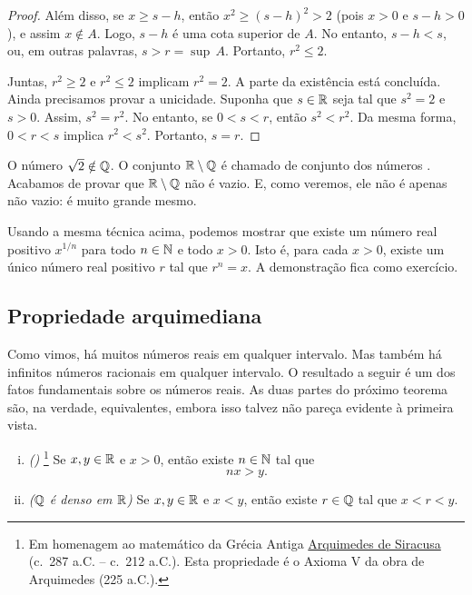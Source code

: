 \begin{example}
\begin{proof}
Além disso, se $x \geq s-h$,
então $x^2 \geq {(s-h)}^2 > 2$ (pois $x > 0$ e $s-h > 0$), e assim $x \notin A$.
Logo,
$s-h$ é uma cota superior de $A$. No entanto, $s-h < s$, ou, em outras
palavras, $s > r = \sup\, A$. Portanto, $r^2 \leq 2$.

\medskip

Juntas, $r^2 \geq 2$ e $r^2 \leq 2$ implicam
$r^2 = 2$. A parte da existência está concluída. Ainda precisamos
provar a unicidade. Suponha que $s \in {\mathbb{R}}$ seja tal que $s^2 = 2$ e $s > 0$.
Assim, $s^2 = r^2$. No entanto, se $0 < s < r$, então $s^2 < r^2$. Da mesma forma,
$0 < r < s$ implica $r^2 < s^2$. Portanto, $s = r$.
\end{proof}
\end{example}

O número $\sqrt{2} \notin {\mathbb{Q}}$. O conjunto
${\mathbb{R}} \setminus {\mathbb{Q}}$ é chamado de conjunto dos números
\emph{}. Acabamos de provar que ${\mathbb{R}} \setminus {\mathbb{Q}}$
não é vazio. E, como veremos, ele não é apenas não vazio: é muito
grande mesmo.

Usando a mesma técnica acima, podemos mostrar que existe um número real positivo
$x^{1/n}$ para todo $n\in {\mathbb{N}}$ e todo $x > 0$.
Isto é, para cada $x > 0$,
existe um único número real positivo $r$ tal que $r^n = x$.
A demonstração fica como exercício.

\subsection{Propriedade arquimediana}

Como vimos, há muitos números reais em qualquer intervalo. Mas também
há infinitos números racionais em qualquer intervalo. O resultado a seguir é
um dos fatos fundamentais sobre os números reais.
As duas partes do próximo teorema são, na verdade, equivalentes, embora isso
talvez não pareça evidente à primeira vista.


\begin{thm} \label{thm:arch}
\pagebreak[3]
\leavevmode
\begin{enumerate}[(i)]
\item \label{thm:arch:i} \emph{()}%
\footnote{Em homenagem ao matemático da Grécia Antiga
\href{https://en.wikipedia.org/wiki/Archimedes}{Arquimedes de Siracusa}
(c.\ 287 a.C. -- c.\ 212 a.C.)\@.
Esta propriedade é o Axioma V da obra de Arquimedes
 (225 a.C.)\@.}
Se $x, y \in {\mathbb{R}}$ e
$x > 0$, então existe $n \in {\mathbb{N}}$ tal que
\begin{equation*}
nx > y .
\end{equation*}
\item \label{thm:arch:ii} \emph{(${\mathbb{Q}}$ é denso em ${\mathbb{R}}$)} Se $x, y \in {\mathbb{R}}$ e
$x < y$, então existe $r \in {\mathbb{Q}}$ tal que
$x < r < y$.
\end{enumerate}
\end{thm}

